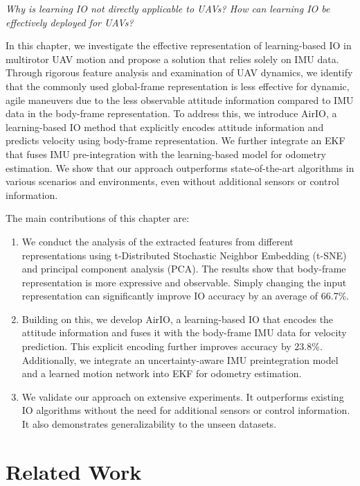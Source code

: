 \textit{Why is learning IO not directly applicable to UAVs? How can learning IO be effectively deployed for UAVs?}

In this chapter, we investigate the effective representation of learning-based IO in multirotor UAV motion and propose a solution that relies solely on IMU data. Through rigorous feature analysis and examination of UAV dynamics, we identify that the commonly used global-frame representation is less effective for dynamic, agile maneuvers due to the less observable attitude information compared to IMU data in the body-frame representation. To address this, we introduce AirIO, a learning-based IO method that explicitly encodes attitude information and predicts velocity using body-frame representation. We further integrate an EKF that fuses IMU pre-integration with the learning-based model for odometry estimation.
We show that our approach outperforms state-of-the-art algorithms \cite{CioffiRal2023} in various scenarios and environments, even without additional sensors or control information.

The main contributions of this chapter are:
\begin{enumerate}
\item We conduct the analysis of the extracted features from different representations using t-Distributed Stochastic Neighbor Embedding (t-SNE) and principal component analysis (PCA). The results show that body-frame representation is more expressive and observable.
Simply changing the input representation can significantly improve IO accuracy by an average of 66.7\%.
\item Building on this, we develop AirIO, a learning-based IO that encodes the attitude information and fuses it with the body-frame IMU data for velocity prediction. This explicit encoding further improves accuracy by 23.8\%.
Additionally, we integrate an uncertainty-aware IMU preintegration model and a learned motion network into EKF for odometry estimation.
\item We validate our approach on extensive experiments. It outperforms existing IO algorithms without the need for additional sensors or control information. It also demonstrates generalizability to the unseen datasets.
\end{enumerate}


\section{Related Work}
\label{sec:airio:relatedwork}

